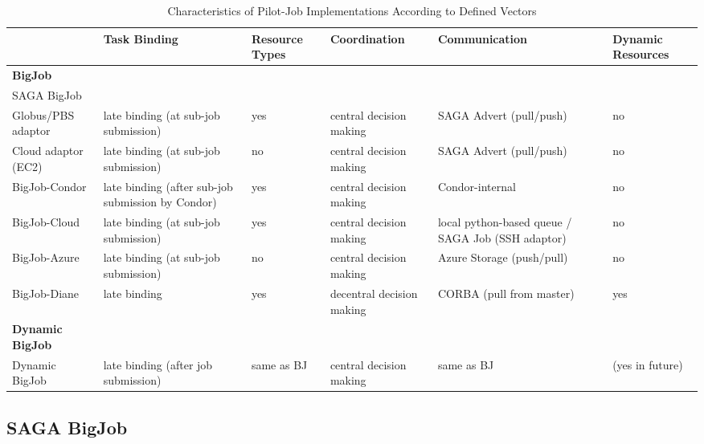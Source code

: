 \documentclass[]{article}
\begin{document}
\begin{table}[t]
\begin{tabular}{|l|p{2.5cm}|p{2cm}|p{2cm}|p{2cm}|p{2cm}|}
	\hline
	&\textbf{Task Binding} &\textbf{Resource Types} &\textbf{Coordina\-tion} & \textbf{Communica\-tion} &\textbf{Dynamic Resources}\\
	\hline
	\textbf{BigJob} & &&&&\\
	\hline
	SAGA BigJob & &&&&\\
	\hline
	\hspace{4mm} Globus/PBS adaptor  &late binding (at sub-job submission)  
									 &yes &central decision making &SAGA Advert (pull/push) &no\\  
	\hline
	\hspace{4mm} Cloud adaptor (EC2) &late binding (at sub-job submission)  
									 &no &central decision making &SAGA Advert (pull/push) &no\\ 
    \hline
   BigJob-Condor &late binding (after sub-job submission by Condor) &yes &central decision making &Condor-internal &no\\
	\hline
 	BigJob-Cloud &late binding (at sub-job submission) &yes &central decision making 
				 &local python-based queue / SAGA Job (SSH adaptor) &no\\ 
	\hline
	BigJob-Azure &late binding (at sub-job submission)
	             &no &central decision making &Azure Storage (push/pull) &no\\ 
	\hline
    BigJob-Diane &late binding  &yes &decentral decision making &CORBA (pull from master) &yes\\ 
	\hline	
	\textbf{Dynamic BigJob} & &&&&\\
	\hline
    Dynamic BigJob &late binding (after job submission) &same as BJ &central decision making &same as BJ &(yes in future)\\
    \hline
\end{tabular}
\caption{Characteristics of Pilot-Job Implementations According 
		to Defined Vectors} \label{tab:pilotjob_overview}
\end{table}		


\subsection{SAGA BigJob}
\end{document}
